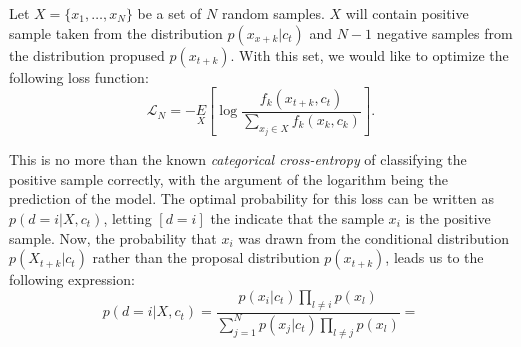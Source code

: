 Let $X = \{x_1,\dots,x_N\}$ be a set of $N$ random samples. $X$ will contain positive sample taken from the distribution $p(x_{x+k}|c_t)$ and $N-1$ negative
samples from the distribution propused $p(x_{t+k})$. With this set, we would like to optimize the following loss function:
$$
\mathcal L_N = - \underset{X}{E} \left[\log \frac{f_k(x_{t+k},c_t)}{\sum_{x_j \in X} f_k(x_k,c_k)}\right].
$$


This is no more than the known \emph{categorical cross-entropy} of classifying the positive sample correctly, with the argument of the logarithm being the prediction
of the model. The optimal probability for this loss can be written as $p(d = i|X,c_t)$, letting $[d = i]$ the indicate that the sample $x_i$ is the positive sample. Now, the probability that $x_i$ was drawn from the conditional
distribution $p(X_{t+k}|c_t)$ rather than the proposal distribution $p(x_{t+k})$, leads us to the following expression:
$$
p(d = i | X , c_t) = \frac{p(x_i|c_t) \prod_{l \neq i}p(x_l)}{\sum_{j=1}^N p(x_j|c_t) \prod_{l \neq j} p(x_l)} = 
$$
